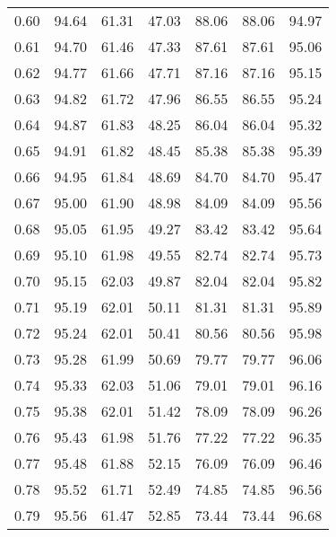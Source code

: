 \begin{tabular}{|c|c|c|c|c|c|c|}
      0.60 &     94.64 &     61.31 &      47.03 &   88.06 &      88.06 &         94.97 \\
      0.61 &     94.70 &     61.46 &      47.33 &   87.61 &      87.61 &         95.06 \\
      0.62 &     94.77 &     61.66 &      47.71 &   87.16 &      87.16 &         95.15 \\
      0.63 &     94.82 &     61.72 &      47.96 &   86.55 &      86.55 &         95.24 \\
      0.64 &     94.87 &     61.83 &      48.25 &   86.04 &      86.04 &         95.32 \\
      0.65 &     94.91 &     61.82 &      48.45 &   85.38 &      85.38 &         95.39 \\
      0.66 &     94.95 &     61.84 &      48.69 &   84.70 &      84.70 &         95.47 \\
      0.67 &     95.00 &     61.90 &      48.98 &   84.09 &      84.09 &         95.56 \\
      0.68 &     95.05 &     61.95 &      49.27 &   83.42 &      83.42 &         95.64 \\
      0.69 &     95.10 &     61.98 &      49.55 &   82.74 &      82.74 &         95.73 \\
      0.70 &     95.15 &     62.03 &      49.87 &   82.04 &      82.04 &         95.82 \\
      0.71 &     95.19 &     62.01 &      50.11 &   81.31 &      81.31 &         95.89 \\
      0.72 &     95.24 &     62.01 &      50.41 &   80.56 &      80.56 &         95.98 \\
      0.73 &     95.28 &     61.99 &      50.69 &   79.77 &      79.77 &         96.06 \\
      0.74 &     95.33 &     62.03 &      51.06 &   79.01 &      79.01 &         96.16 \\
      0.75 &     95.38 &     62.01 &      51.42 &   78.09 &      78.09 &         96.26 \\
      0.76 &     95.43 &     61.98 &      51.76 &   77.22 &      77.22 &         96.35 \\
      0.77 &     95.48 &     61.88 &      52.15 &   76.09 &      76.09 &         96.46 \\
      0.78 &     95.52 &     61.71 &      52.49 &   74.85 &      74.85 &         96.56 \\
      0.79 &     95.56 &     61.47 &      52.85 &   73.44 &      73.44 &         96.68 \\

\end{tabular}
